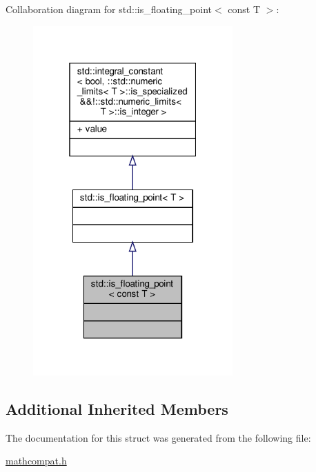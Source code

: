 Collaboration diagram for std\+:\+:is\+\_\+floating\+\_\+point$<$ const T $>$\+:\nopagebreak
\begin{figure}[H]
\begin{center}
\leavevmode
\includegraphics[width=217pt]{d7/d74/structstd_1_1is__floating__point_3_01const_01T_01_4__coll__graph}
\end{center}
\end{figure}
\subsection*{Additional Inherited Members}


The documentation for this struct was generated from the following file\+:\begin{DoxyCompactItemize}
\item 
\hyperlink{mathcompat_8h}{mathcompat.\+h}\end{DoxyCompactItemize}

